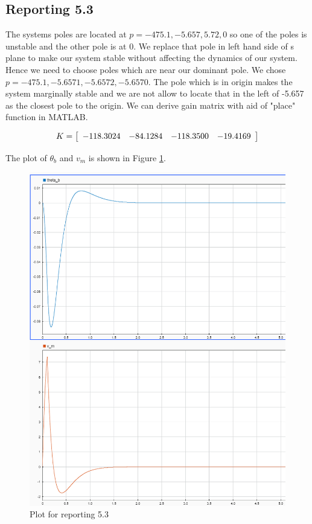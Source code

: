 \documentclass[11pt]{article}
\begin{document}
\subsection*{Reporting 5.3}
The systems poles are located at $p=-475.1,-5.657,5.72, 0$ so one of the poles is unstable and the other pole is at 0. We replace that pole in left hand side of s plane to make our system stable without affecting the dynamics of our system. Hence we need to choose poles which are near our dominant pole. We chose \textbf{$p=-475.1,  -5.6571,  -5.6572,  -5.6570$}. The pole which is in origin makes the system marginally stable and we are not allow to locate that in the left of -5.657 as the closest pole to the origin. We can derive gain matrix with aid of "place" function in MATLAB.  


$$K=\left\lbrack \begin{array}{cccc}\linebreak 
-118. 3024 & -84. 1284 & -118. 3500 &  -19.  4169\linebreak 
\end{array}\right\rbrack$$


The plot of $\theta_b$ and $v_m$ is shown in Figure \ref{fig:plot2}.



\begin{figure}[ht]
  \centering
  \includegraphics[width=0.7\linewidth]{Images/report53.png}
  \caption{Plot for reporting 5.3}
  \label{fig:plot2}
\end{figure}
\end{document}
